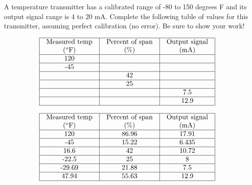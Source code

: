

A temperature transmitter has a calibrated range of -80 to 150 degrees F and its output signal range is 4 to 20 mA.  Complete the following table of values for this transmitter, assuming perfect calibration (no error).  Be sure to show your work!


$$\vbox{\offinterlineskip
\halign{\strut
\vrule \quad\hfil # \ \hfil & 
\vrule \quad\hfil # \ \hfil & 
\vrule \quad\hfil # \ \hfil \vrule \cr
\noalign{\hrule}
%
Measured temp & Percent of span & Output signal \cr
%
($^{o}$F) & (\%) & (mA) \cr
%
\noalign{\hrule}
%
120 &  &  \cr
%
\noalign{\hrule}
%
-45 &  &  \cr
%
\noalign{\hrule}
%
 & 42 &  \cr
%
\noalign{\hrule}
%
 & 25 &  \cr
%
\noalign{\hrule}
%
 &  & 7.5 \cr
%
\noalign{\hrule}
%
 &  & 12.9 \cr
%
\noalign{\hrule}
} %
}$$ %








$$\vbox{\offinterlineskip
\halign{\strut
\vrule \quad\hfil # \ \hfil & 
\vrule \quad\hfil # \ \hfil & 
\vrule \quad\hfil # \ \hfil \vrule \cr
\noalign{\hrule}
%
Measured temp & Percent of span & Output signal \cr
%
($^{o}$F) & (\%) & (mA) \cr
%
\noalign{\hrule}
%
120 & 86.96 & 17.91 \cr
%
\noalign{\hrule}
%
-45 & 15.22 & 6.435 \cr
%
\noalign{\hrule}
%
16.6 & 42 & 10.72 \cr
%
\noalign{\hrule}
%
-22.5 & 25 & 8 \cr
%
\noalign{\hrule}
%
-29.69 & 21.88 & 7.5 \cr
%
\noalign{\hrule}
%
47.94 & 55.63 & 12.9 \cr
%
\noalign{\hrule}
} %
}$$ %











